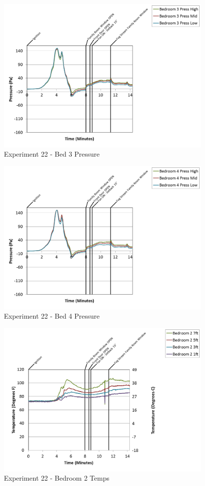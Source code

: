 \documentclass{article}
\begin{document}
\begin{appendices}
\begin{figure}[h!]
	\centering
	\includegraphics[height=3.05in]{0_Images/Results_Charts/Exp_22_Charts/Bed3Pressure.png}
	\caption{Experiment 22 - Bed 3 Pressure}
\end{figure}

\clearpage

\begin{figure}[h!]
	\centering
	\includegraphics[height=3.05in]{0_Images/Results_Charts/Exp_22_Charts/Bed4Pressure.png}
	\caption{Experiment 22 - Bed 4 Pressure}
\end{figure}


\begin{figure}[h!]
	\centering
	\includegraphics[height=3.05in]{0_Images/Results_Charts/Exp_22_Charts/Bedroom2Temps.png}
	\caption{Experiment 22 - Bedroom 2 Temps}
\end{figure}


\end{appendices}
\end{document}
